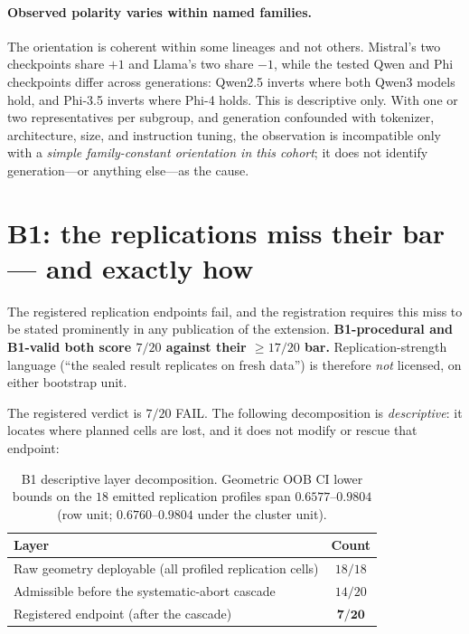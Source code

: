 \documentclass[11pt]{article}
\begin{document}
\paragraph{Observed polarity varies within named families.} The orientation is coherent within some
lineages and not others. Mistral's two checkpoints share $+1$ and Llama's two share $-1$, while the
tested Qwen and Phi checkpoints differ across generations: Qwen2.5 inverts where both Qwen3 models
hold, and Phi-3.5 inverts where Phi-4 holds. This is descriptive only. With one or two
representatives per subgroup, and generation confounded with tokenizer, architecture, size, and
instruction tuning, the observation is incompatible only with a \emph{simple family-constant
orientation in this cohort}; it does not identify generation---or anything else---as the cause.

\section{B1: the replications miss their bar --- and exactly how}

The registered replication endpoints fail, and the registration requires this miss to be stated
prominently in any publication of the extension. \textbf{B1-procedural and B1-valid both score
$7/20$ against their $\geq 17/20$ bar.} Replication-strength language (``the sealed result
replicates on fresh data'') is therefore \emph{not} licensed, on either bootstrap unit.

The registered verdict is $7/20$ FAIL. The following decomposition is \emph{descriptive}: it
locates where planned cells are lost, and it does not modify or rescue that endpoint:

\begin{table}[H]
\centering\small
\begin{tabular}{@{}lc@{}}
\toprule
Layer & Count \\
\midrule
Raw geometry deployable (all profiled replication cells) & $18/18$ \\
Admissible before the systematic-abort cascade & $14/20$ \\
Registered endpoint (after the cascade) & $\mathbf{7/20}$ \\
\bottomrule
\end{tabular}
\caption{B1 descriptive layer decomposition. Geometric OOB CI lower bounds on the $18$ emitted
replication profiles span $0.6577$--$0.9804$ (row unit; $0.6760$--$0.9804$ under the cluster
unit).}
\label{tab:b1}
\end{table}
\end{document}
